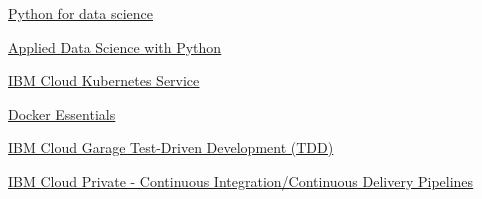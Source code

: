 \begin{coursework}

        {\href{https://courses.edx.org/certificates/0626a02340944e6b9b1854be5e171da0}
        {\underline{Python for data science}}}


        {\href{https://www.youracclaim.com/badges/6f524dff-5ffb-42bd-8e32-f4f3ea50e26c/public_url}
        {\underline{Applied Data Science with Python}}}

        {\href{https://www.youracclaim.com/badges/70a31b3d-c964-4a2d-8f31-ed58a0b00ea7}
        {\underline{IBM Cloud Kubernetes Service}}}





        {\href{https://www.credly.com/badges/945bcc69-3954-4714-8d33-005ae2a0c6c7}
        {\underline{Docker Essentials}}}


        {\href{https://www.credly.com/badges/9a2fbd8d-8140-430e-b2a6-2befbc0ff81e}
        {\underline{IBM Cloud Garage Test-Driven Development (TDD)}}}

        {\href{https://www.credly.com/badges/16c6ed00-aecc-4e87-b155-27021d8bfbba}
        {\underline{IBM Cloud Private - Continuous Integration/Continuous Delivery Pipelines}}}


\end{coursework}
